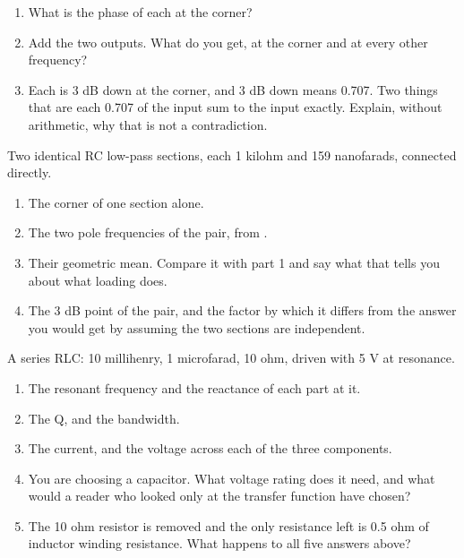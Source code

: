 \begin{enumerate}
  \item What is the phase of each at the corner?
  \item Add the two outputs. What do you get, at the corner and at every other frequency?
  \item Each is 3 dB down at the corner, and 3 dB down means 0.707. Two things that are each 0.707 of the input sum to the input exactly. Explain, without arithmetic, why that is not a contradiction.
\end{enumerate}

\label{c3:ex:3}
Two identical RC low-pass sections, each 1 kilohm and 159 nanofarads, connected directly.

\begin{enumerate}
  \item The corner of one section alone.
  \item The two pole frequencies of the pair, from .
  \item Their geometric mean. Compare it with part 1 and say what that tells you about what loading does.
  \item The 3 dB point of the pair, and the factor by which it differs from the answer you would get by assuming the two sections are independent.
\end{enumerate}

\label{c3:ex:4}
A series RLC: 10 millihenry, 1 microfarad, 10 ohm, driven with 5 V at resonance.

\begin{enumerate}
  \item The resonant frequency and the reactance of each part at it.
  \item The Q, and the bandwidth.
  \item The current, and the voltage across each of the three components.
  \item You are choosing a capacitor. What voltage rating does it need, and what would a reader who looked only at the transfer function have chosen?
  \item The 10 ohm resistor is removed and the only resistance left is 0.5 ohm of inductor winding resistance. What happens to all five answers above?
\end{enumerate}

